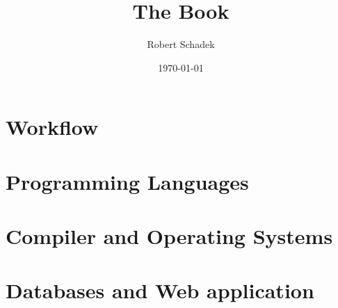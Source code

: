 \documentclass[a4paper,9pt]{book}
\title{The Book}
\author{Robert Schadek}
\date{\today}
\begin{document}
\maketitle
\setcounter{tocdepth}{5}
\setcounter{secnumdepth}{5}
\setlength{\parindent}{0cm}
\tableofcontents

\setlength{\columnsep}{6mm}
\twocolumn

\part{Workflow}
\setlength{\columnseprule}{0.1pt}





\part{Programming Languages}







\part{Compiler and Operating Systems}
%

\part{Databases and Web application}

\end{document}
